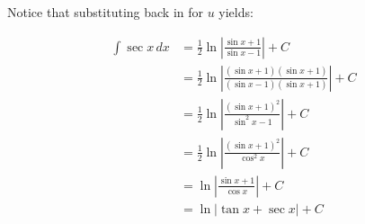 \documentclass[12pt]{article}
\begin{document}
\begin{enumerate}
\begin{enumerate}
\end{enumerate}

Notice that substituting back in for $u$ yields:

\begin{center}
\begin{align*}
\int \sec{x} \,dx &= \frac{1}{2}\ln{\left|\frac{\sin{x}+1}{\sin{x}-1}\right|}+C\\
&=\frac{1}{2}\ln{\left|\frac{(\sin{x}+1)(\sin{x}+1)}{(\sin{x}-1)(\sin{x}+1)}\right|}+C\\
&=\frac{1}{2}\ln{\left|\frac{(\sin{x}+1)^2}{\sin^2{x}-1}\right|}+C\\
&=\frac{1}{2}\ln{\left|\frac{(\sin{x}+1)^2}{\cos^2{x}}\right|}+C\\
&=\ln{\left|\frac{\sin{x}+1}{\cos{x}}\right|}+C\\
&=\ln{\left|\tan{x}+\sec{x}\right|}+C
\end{align*}
\end{center}

\end{enumerate}
\end{document}
